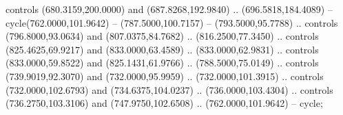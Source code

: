 controls (680.3159,200.0000) and (687.8268,192.9840) .. (696.5818,184.4089) -- cycle(762.0000,101.9642) -- (787.5000,100.7157) -- (793.5000,95.7788) .. controls (796.8000,93.0634) and (807.0375,84.7682) .. (816.2500,77.3450) .. controls (825.4625,69.9217) and (833.0000,63.4589) .. (833.0000,62.9831) .. controls (833.0000,59.8522) and (825.1431,61.9766) .. (788.5000,75.0149) .. controls (739.9019,92.3070) and (732.0000,95.9959) .. (732.0000,101.3915) .. controls (732.0000,102.6793) and (734.6375,104.0237) .. (736.0000,103.4304) .. controls (736.2750,103.3106) and (747.9750,102.6508) .. (762.0000,101.9642) -- cycle;
